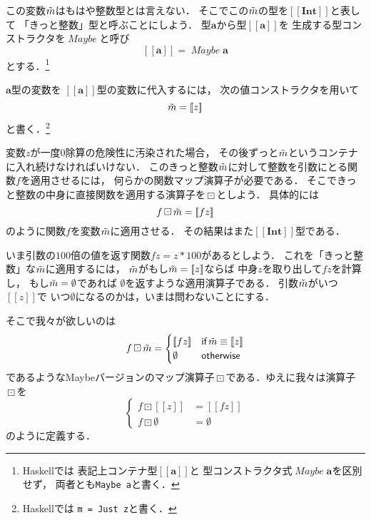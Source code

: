 \documentclass[a5paper,draft]{jsbook}
\def\[{\left[\!\left[}
\def\]{\right]\!\right]}
\newcommand{\programminglanguage}[1]{\textsf{#1}}
\newcommand{\haskell}{\programminglanguage{Haskell}}
\newcommand{\code}[1]{\texttt{#1}}
\newcommand{\mathTypeParameter}[1]{\mathbf{#1}}
\newcommand{\mathTypeName}[1]{\mathbf{#1}}
\newcommand{\mathTypeConstructor}[1]{\mathit{#1}} %
\newcommand{\mathMaybeWith}[1]{\[#1\]}
\newcommand{\mathMaybeType}[1]{\[#1\]}
\newcommand{\mathMaybeVar}[1]{\Tilde{#1}}
\DeclareMathOperator{\mathMaybe}{\mathTypeConstructor{Maybe}}
\newcommand{\mathNothing}{\emptyset}%
\newcommand{\mathBinaryOperator}[1]{\operatorname{#1}}
\newcommand{\mathMaybeMap}{\mathBinaryOperator{\boxdot}}
\newcommand{\mathKeyword}[1]{\operatorname{\textsf{#1}}}
\newcommand{\mathIf}{\mathKeyword{if}}
\newcommand{\mathOtherwise}{\mathKeyword{otherwise}}
\begin{document}
この変数$\mathMaybeVar{m}$はもはや整数型とは言えない．
そこでこの$\mathMaybeVar{m}$の型を$\mathMaybeType{\mathTypeName{Int}}$と表して
「きっと整数」型と呼ぶことにしよう．
型$\mathTypeParameter{a}$から型$\mathMaybeType{\mathTypeParameter{a}}$を
生成する型コンストラクタを$\mathMaybe$と呼び
$$
\mathMaybeType{\mathTypeParameter{a}}
=\mathMaybe\mathTypeParameter{a}
$$
とする．\footnote{\haskell では
表記上コンテナ型$\mathMaybeType{\mathTypeParameter{a}}$と
型コンストラクタ式$\mathMaybe\mathTypeParameter{a}$を区別せず，
両者とも\code{Maybe a}と書く．}

$\mathTypeParameter{a}$型の変数を
$\mathMaybeType{\mathTypeParameter{a}}$型の変数に代入するには，
次の値コンストラクタを用いて
$$
\mathMaybeVar{m}=\mathMaybeWith{z}
$$
と書く．\footnote{\haskell では
\code{m = Just z}と書く．}

変数$z$が一度$0$除算の危険性に汚染された場合，
その後ずっと$\mathMaybeVar{m}$というコンテナに入れ続けなければいけない．
このきっと整数$\mathMaybeVar{m}$に対して整数を引数にとる関数$f$を適用させるには，
何らかの関数マップ演算子が必要である．
そこできっと整数の中身に直接関数を適用する演算子を$\mathMaybeMap$としよう．
具体的には
$$
f\mathMaybeMap\mathMaybeVar{m}=\mathMaybeWith{fz}
$$
のように関数$f$を変数$\mathMaybeVar{m}$に適用させる．
その結果はまた$\mathMaybeType{\mathTypeName{Int}}$型である．

いま引数の$100$倍の値を返す関数$fz=z*100$があるとしよう．
これを「きっと整数」な$\mathMaybeVar{m}$に適用するには，
$\mathMaybeVar{m}$がもし$\mathMaybeVar{m}=\mathMaybeWith{z}$ならば
中身$z$を取り出して$fz$を計算し，
もし$\mathMaybeVar{m}=\mathNothing$であれば
$\mathNothing$を返すような適用演算子である．
引数$\mathMaybeVar{m}$がいつ$\mathMaybeWith{z}$で
いつ$\mathNothing$になるのかは，いまは問わないことにする．

そこで我々が欲しいのは
\begin{equation}
f\mathMaybeMap\mathMaybeVar{m}=\begin{cases}
\mathMaybeWith{fz}&\mathIf\mathMaybeVar{m}\equiv\mathMaybeWith{z}\\
\mathNothing&\mathOtherwise
\end{cases}
\end{equation}
であるようなMaybeバージョンのマップ演算子$\mathMaybeMap$である．ゆえに我々は演算子$\mathMaybeMap$を
\begin{equation}
\left\{
\begin{split}
f\mathMaybeMap\mathMaybeWith{z}&=\mathMaybeWith{fz}\\
f\mathMaybeMap\mathNothing&=\mathNothing
\end{split}
\right.
\end{equation}
のように定義する．
\end{document}
